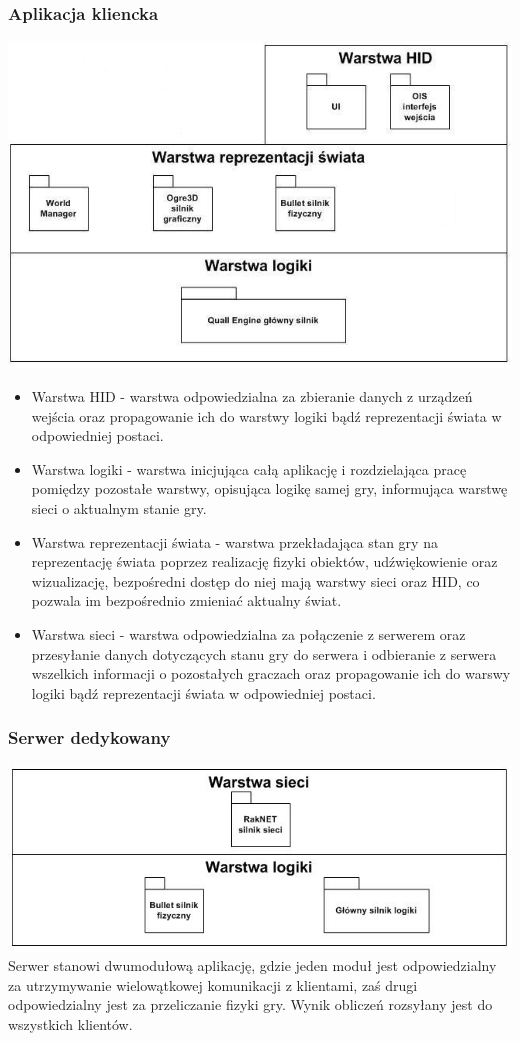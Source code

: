 \documentclass[12pt,a4paper,twoside]{article}
\begin{document}
\subsubsection{Aplikacja kliencka}
\includegraphics{pics/LogicalViewClient.jpg}
\begin{itemize}
\item Warstwa HID - warstwa odpowiedzialna za zbieranie danych z urządzeń wejścia oraz propagowanie ich do warstwy logiki bądź reprezentacji świata w odpowiedniej postaci.
\item Warstwa logiki - warstwa inicjująca całą aplikację i rozdzielająca pracę pomiędzy pozostałe warstwy, opisująca logikę samej gry, informująca warstwę sieci o aktualnym stanie gry.
\item Warstwa reprezentacji świata - warstwa przekładająca stan gry na reprezentację świata poprzez realizację fizyki obiektów, udźwiękowienie oraz wizualizację, bezpośredni dostęp do niej mają warstwy sieci oraz HID, co pozwala im bezpośrednio zmieniać aktualny świat.
\item Warstwa sieci - warstwa odpowiedzialna za połączenie z serwerem oraz przesyłanie danych dotyczących stanu gry do serwera i odbieranie z serwera wszelkich informacji o pozostałych graczach oraz propagowanie ich do warswy logiki bądź reprezentacji świata w odpowiedniej postaci.
\end{itemize}

\subsubsection{Serwer dedykowany}
\includegraphics{pics/LogicalViewServer.jpg}
Serwer stanowi dwumodułową aplikację, gdzie jeden moduł jest odpowiedzialny za utrzymywanie wielowątkowej komunikacji z klientami, zaś drugi odpowiedzialny jest za przeliczanie fizyki gry. Wynik obliczeń rozsyłany jest do wszystkich klientów.
\end{document}
